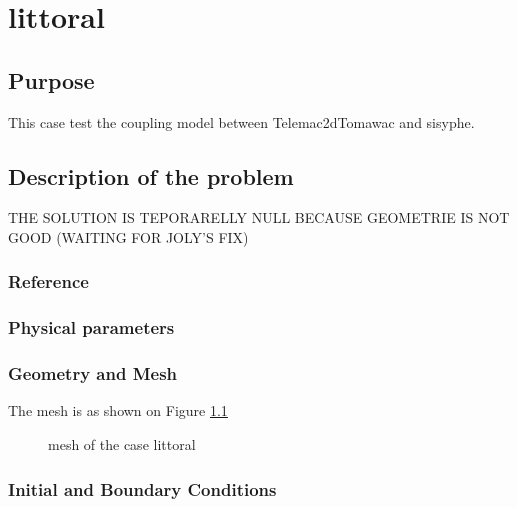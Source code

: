 \chapter{littoral}
%

%
\section{Purpose}
%
This case test the coupling model between Telemac2dTomawac and sisyphe.
%
\section{Description of the problem}
%
THE SOLUTION IS TEPORARELLY NULL BECAUSE GEOMETRIE IS NOT GOOD (WAITING FOR JOLY'S FIX)
%
%
\subsection{Reference}
%

%
%
\subsection{Physical parameters}
%

%
%
\subsection{Geometry and Mesh}
%
The mesh is as shown on Figure \ref{littoralmesh}
\begin{figure} [!h]
\centering
{}
 \caption{mesh of the case littoral}
\label{littoralmesh}
\end{figure}

%
%
\subsection{Initial and Boundary Conditions}
%

